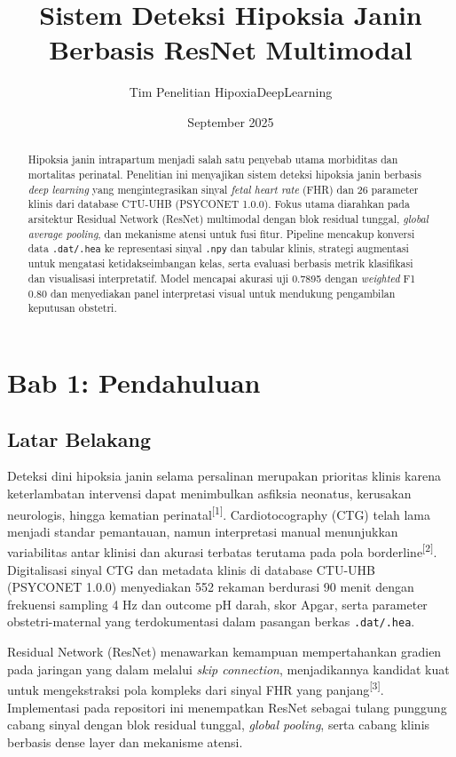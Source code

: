 \documentclass[12pt,a4paper]{article}
\title{Sistem Deteksi Hipoksia Janin Berbasis ResNet Multimodal}
\author{Tim Penelitian HipoxiaDeepLearning}
\date{September 2025}
\begin{document}
\maketitle

\begin{abstract}
Hipoksia janin intrapartum menjadi salah satu penyebab utama morbiditas dan mortalitas perinatal. Penelitian ini menyajikan sistem deteksi hipoksia janin berbasis \textit{deep learning} yang mengintegrasikan sinyal \textit{fetal heart rate} (FHR) dan 26 parameter klinis dari database CTU-UHB (PSYCONET 1.0.0). Fokus utama diarahkan pada arsitektur Residual Network (ResNet) multimodal dengan blok residual tunggal, \textit{global average pooling}, dan mekanisme atensi untuk fusi fitur. Pipeline mencakup konversi data \texttt{.dat/.hea} ke representasi sinyal \texttt{.npy} dan tabular klinis, strategi augmentasi untuk mengatasi ketidakseimbangan kelas, serta evaluasi berbasis metrik klasifikasi dan visualisasi interpretatif. Model mencapai akurasi uji 0.7895 dengan \textit{weighted} F1 0.80 dan menyediakan panel interpretasi visual untuk mendukung pengambilan keputusan obstetri.
\end{abstract}

\tableofcontents
\newpage

\section{Bab 1: Pendahuluan}
\subsection{Latar Belakang}
Deteksi dini hipoksia janin selama persalinan merupakan prioritas klinis karena keterlambatan intervensi dapat menimbulkan asfiksia neonatus, kerusakan neurologis, hingga kematian perinatal\textsuperscript{[1]}. Cardiotocography (CTG) telah lama menjadi standar pemantauan, namun interpretasi manual menunjukkan variabilitas antar klinisi dan akurasi terbatas terutama pada pola borderline\textsuperscript{[2]}. Digitalisasi sinyal CTG dan metadata klinis di database CTU-UHB (PSYCONET 1.0.0) menyediakan 552 rekaman berdurasi 90 menit dengan frekuensi sampling 4 Hz dan outcome pH darah, skor Apgar, serta parameter obstetri-maternal yang terdokumentasi dalam pasangan berkas \texttt{.dat/.hea}.

Residual Network (ResNet) menawarkan kemampuan mempertahankan gradien pada jaringan yang dalam melalui \textit{skip connection}, menjadikannya kandidat kuat untuk mengekstraksi pola kompleks dari sinyal FHR yang panjang\textsuperscript{[3]}. Implementasi pada repositori ini menempatkan ResNet sebagai tulang punggung cabang sinyal dengan blok residual tunggal, \textit{global pooling}, serta cabang klinis berbasis dense layer dan mekanisme atensi.
\end{document}
